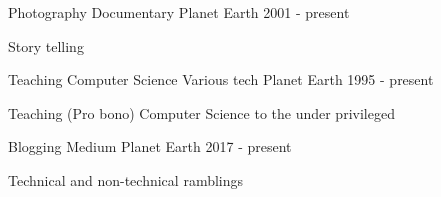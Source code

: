 

\begin{cventries}

  \cventry
    {Photography} %
    {Documentary} %
    {Planet Earth} %
    {2001 - present} %
    {
      \begin{cvitems} %
        \item {Story telling}
      \end{cvitems}
    }

  \cventry
    {Teaching Computer Science} %
    {Various tech} %
    {Planet Earth} %
    {1995 - present} %
    {
      \begin{cvitems} %
        \item {Teaching (Pro bono) Computer Science to the under privileged}
      \end{cvitems}
    }

  \cventry
    {Blogging} %
    {Medium} %
    {Planet Earth} %
    {2017 - present} %
    {
      \begin{cvitems} %
        \item {Technical and non-technical ramblings}
      \end{cvitems}
    }

\end{cventries}
